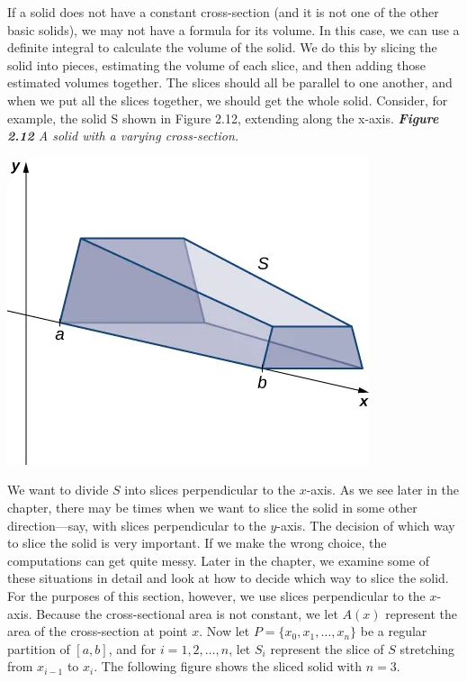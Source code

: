 \documentclass{report}
\begin{document}
    \pagebreak \bigbreak \noindent 
    If a solid does not have a constant cross-section (and it is not one of the other basic solids), we may not have a formula for its volume. In this case, we can use a definite integral to calculate the volume of the solid. We do this by slicing the solid into pieces, estimating the volume of each slice, and then adding those estimated volumes together. The slices should all be parallel to one another, and when we put all the slices together, we should get the whole solid. Consider, for example, the solid S shown in Figure 2.12, extending along the x-axis.
    \bigbreak \noindent 
    \textit{\textbf{Figure 2.12} A solid with a varying cross-section.}
    \bigbreak \noindent 
    \begin{center}
        \includegraphics[scale=0.6]{./figures/graph9.png}
    \end{center}
    \bigbreak \noindent 
    We want to divide \( S \) into slices perpendicular to the \( x \)-axis. As we see later in the chapter, there may be times when we want to slice the solid in some other direction---say, with slices perpendicular to the \( y \)-axis. The decision of which way to slice the solid is very important. If we make the wrong choice, the computations can get quite messy. Later in the chapter, we examine some of these situations in detail and look at how to decide which way to slice the solid. For the purposes of this section, however, we use slices perpendicular to the \( x \)-axis.
    \bigbreak \noindent 
    Because the cross-sectional area is not constant, we let \( A(x) \) represent the area of the cross-section at point \( x \). Now let \( P = \{ x_0, x_1, \ldots, x_n \} \) be a regular partition of \([a, b]\), and for \( i = 1, 2, \ldots, n \), let \( S_i \) represent the slice of \( S \) stretching from \( x_{i-1} \) to \( x_i \). The following figure shows the sliced solid with \( n = 3 \).
\end{document}
